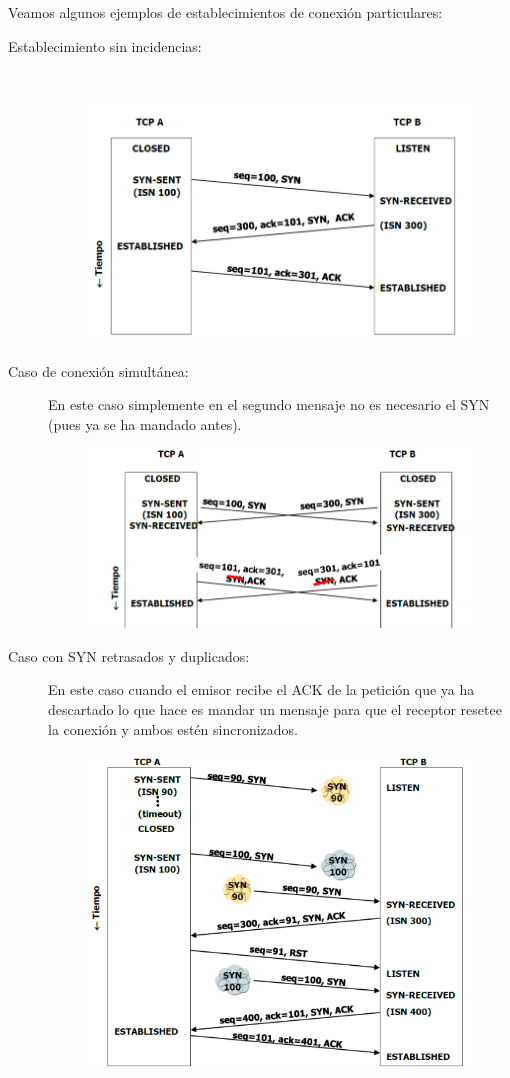 Veamos algunos ejemplos de establecimientos de conexión particulares:
\begin{description}
    \item [Establecimiento sin incidencias:]~\\ 
\begin{figure}[H]
    \centering
    \includegraphics[width=0.6\linewidth]{./images/conexion-normal.png}
\end{figure}
    \item [Caso de conexión simultánea:] En este caso simplemente en el segundo mensaje no es necesario el SYN (pues ya se ha mandado antes).
\begin{figure}[H]
    \centering
    \includegraphics[width=0.6\linewidth]{./images/conexion-simul.png}
\end{figure}
    \item [Caso con SYN retrasados y duplicados:] En este caso cuando el emisor recibe el ACK de la petición que ya ha descartado lo que hace es mandar un mensaje para que el receptor resetee la conexión y ambos estén sincronizados.
\begin{figure}[H]
    \centering
    \includegraphics[width=0.6\linewidth]{./images/conexion-retardo.png}
\end{figure}
\end{description}

